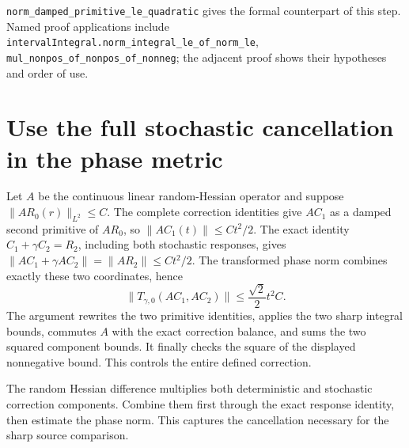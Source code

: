\documentclass[11pt,a4paper]{article}
\begin{document}
\begin{leanbox}
\texttt{norm\_\allowbreak{}damped\_\allowbreak{}primitive\_\allowbreak{}le\_\allowbreak{}quadratic} gives the formal counterpart of this step. Named proof applications include \texttt{interval\allowbreak{}Integral.\allowbreak{}norm\_\allowbreak{}integral\_\allowbreak{}le\_\allowbreak{}of\_\allowbreak{}norm\_\allowbreak{}le}, \texttt{mul\_\allowbreak{}nonpos\_\allowbreak{}of\_\allowbreak{}nonpos\_\allowbreak{}of\_\allowbreak{}nonneg}; the adjacent proof shows their hypotheses and order of use.
\end{leanbox}

\section{\texorpdfstring{Use the full stochastic cancellation in the phase metric}{Use the full stochastic cancellation in the phase metric}}


Let \(A\) be the continuous linear random-Hessian operator and suppose \(\|AR_0(r)\|_{L^2}\le C\). The complete correction identities give \(AC_1\) as a damped second primitive of \(AR_0\), so \(\|AC_1(t)\|\le Ct^2/2\). The exact identity \(C_1+\gamma C_2=R_2\), including both stochastic responses, gives \(\|AC_1+\gamma AC_2\|=\|AR_2\|\le Ct^2/2\). The transformed phase norm combines exactly these two coordinates, hence \[\|T_{\gamma,0}(AC_1,AC_2)\|\le\frac{\sqrt2}{2}t^2C.\] The argument rewrites the two primitive identities, applies the two sharp integral bounds, commutes \(A\) with the exact correction balance, and sums the two squared component bounds. It finally checks the square of the displayed nonnegative bound. This controls the entire defined correction.



The random Hessian difference multiplies both deterministic and stochastic correction components. Combine them first through the exact response identity, then estimate the phase norm. This captures the cancellation necessary for the sharp source comparison.
\end{document}
